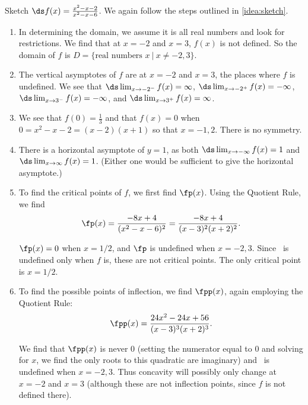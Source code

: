 \begin{example}\label{ex_sketch2}
Sketch $\ds f(x) = \frac{x^2-x-2}{x^2-x-6}$.
\solution
We again follow the steps outlined in \autoref{idea:sketch}.

\begin{enumerate}
	\item	In determining the domain, we assume it is all real numbers and look for restrictions. We find that at $x=-2$ and $x=3$, $f(x)$ is not defined. So the domain of $f$ is $D = \{\text{real numbers } x\ \vert \ x\neq -2,3\}$.
		
	\item	The vertical asymptotes of $f$ are at $x=-2$ and $x=3$, the places where $f$ is undefined.  We see that $\ds\lim_{x\to-2^-}f(x)=\infty$, $\ds\lim_{x\to-2^+}f(x)=-\infty$, $\ds\lim_{x\to3^-}f(x)=-\infty$, and $\ds\lim_{x\to3^+}f(x)=\infty$.
		
	\item	We see that $f(0)=\frac13$ and that $f(x)=0$ when $0=x^2-x-2=(x-2)(x+1)$ so that $x=-1,2$.  There is no symmetry.

	\item	There is a horizontal asymptote of $y=1$, as both $\ds \lim_{x\to -\infty}f(x) = 1$ and $\ds\lim_{x\to\infty}f(x) =1$.  (Either one would be sufficient to give the horizontal asymptote.)
		
	\item	To find the critical points of $f$, we first find $\fp(x)$. Using the Quotient Rule, we find
	\[\fp(x) = \frac{-8x+4}{(x^2-x-6)^2} = \frac{-8x+4}{(x-3)^2(x+2)^2}.\]
		
	$\fp(x) = 0$ when $x = 1/2$, and $\fp$ is undefined when $x=-2,3$. Since \fp\ is undefined only when $f$ is, these are not critical points. The only critical point is $x=1/2$.
		
	\item	To find the possible points of inflection, we find $\fpp(x)$, again employing the Quotient Rule:
	\[\fpp(x) = \frac{24x^2-24x+56}{(x-3)^3(x+2)^3}.\]

	We find that $\fpp(x)$ is never 0 (setting the numerator equal to 0 and solving for $x$, we find the only roots to this quadratic are imaginary) and \fpp\ is undefined when $x=-2,3$. Thus concavity will possibly only change at $x=-2$ and $x=3$ (although these are not inflection points, since $f$ is not defined there).
		

\end{enumerate}
\end{example}
